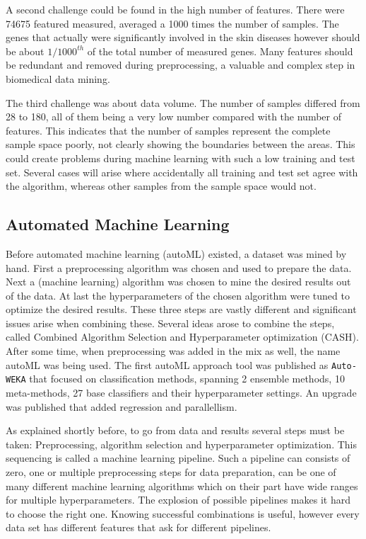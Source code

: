 \documentclass[10pt,a4paper]{article}
\begin{document}
	A second challenge could be found in the high number of features. There were 74675 featured measured, averaged a 1000 times the number of samples. The genes that actually were significantly involved in the skin diseases however should be about $1/1000^{th}$ of the total number of measured genes. Many features should be redundant and removed during preprocessing, a valuable and complex step in biomedical data mining.
	
	 The third challenge was about data volume. The number of samples differed from 28 to 180, all of them being a very low number compared with the number of features. This indicates that the number of samples represent the complete sample space poorly, not clearly showing the boundaries between the areas. This could create problems during machine learning with such a low training and test set. Several cases will arise where accidentally all training and test set agree with the algorithm, whereas other samples from the sample space would not.

	\subsection{Automated Machine Learning}
	\label{subsec:AutomatedMachineLearning}
	
	Before automated machine learning (autoML) existed, a dataset was mined by hand. First a preprocessing algorithm was chosen and used to prepare the data. Next a (machine learning) algorithm was chosen to mine the desired results out of the data. At last the hyperparameters of the chosen algorithm were tuned to optimize the desired results. These three steps are vastly different and significant issues arise when combining these. Several ideas arose to combine the steps, called Combined Algorithm Selection and Hyperparameter optimization (CASH). \cite{thornton2013auto} After some time, when preprocessing was added in the mix as well, the name autoML was being used. \cite{Gijsbers2017Thesis} The first autoML approach tool was published as \texttt{Auto-WEKA} that focused on classification methods, spanning 2 ensemble methods, 10 meta-methods, 27 base classifiers and their hyperparameter settings. \cite{thornton2013auto} An upgrade was published that added regression and parallellism. \cite{kotthoff2016auto}   
	
	As explained shortly before, to go from data and results several steps must be taken: Preprocessing, algorithm selection and hyperparameter optimization. This sequencing is called a machine learning pipeline. Such a pipeline can consists of zero, one or multiple preprocessing steps for data preparation, can be one of many different machine learning algorithms which on their part have wide ranges for multiple hyperparameters. The explosion of possible pipelines makes it hard to choose the right one. Knowing successful combinations is useful, however every data set has different features that ask for different pipelines. \cite{Gijsbers2017Thesis}
	
\end{document}
